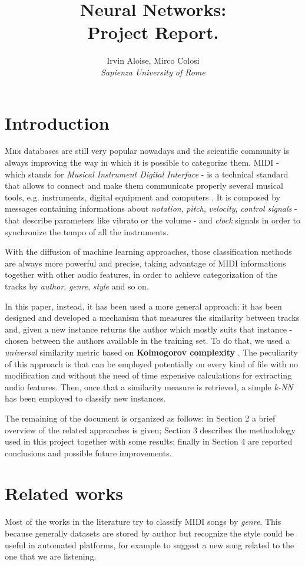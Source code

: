 \documentclass[a4paper]{article}
\title{ \huge Neural Networks: \\
	Project Report.}
\author{Irvin Aloise, Mirco Colosi\\
	\textit{Sapienza University of Rome}}
\begin{document}
	
	\maketitle
	
	\section{Introduction}
	\lettrine[nindent=0em,lines=2]{M}{idi} databases are still very popular nowadays and the scientific community is always improving the way in which it is possible to categorize them. MIDI - which stands for \textit{Musical Instrument Digital Interface} - is a technical standard that allows to connect and make them communicate properly several musical tools, e.g. instruments, digital equipment and computers \cite{midi}. It is composed by messages containing informations about \textit{notation}, \textit{pitch}, \textit{velocity}, \textit{control signals} - that describe parameters like vibrato or the volume - and \textit{clock} signals in order to synchronize the tempo of all the instruments.
	
	With the diffusion of machine learning approaches, those classification methods are always more powerful and precise, taking advantage of MIDI informations together with other audio features, in order to achieve categorization of the tracks by \textit{author}, \textit{genre}, \textit{style} and so on. 
	
	In this paper, instead, it has been used a more general approach: it has been designed and developed a mechanism that measures the similarity between tracks and, given a new instance returns the author which mostly suits that instance - chosen between the authors available in the training set. To do that, we used a \textit{universal} similarity metric based on \textbf{Kolmogorov complexity} \cite{kolmogorov}. The peculiarity of this approach is that can be employed potentially on every kind of file with no modification and without the need of time expensive calculations for extracting audio features. Then, once that a similarity measure is retrieved, a simple \textit{k-NN} has been employed to classify new instances.
	
	The remaining of the document is organized as follows: in Section 2 a brief overview of the related approaches is given; Section 3 describes the methodology used in this project together with some results; finally in Section 4 are reported conclusions and possible future improvements.
	
	
	\section{Related works}
	\lettrine[nindent=0em,lines=2]{M}{}ost of the works in the literature try to classify MIDI songs by \textit{genre}. This because generally datasets are stored by author but recognize the style could be useful in automated platforms, for example to suggest a new song related to the one that we are listening. 
	
\end{document}
